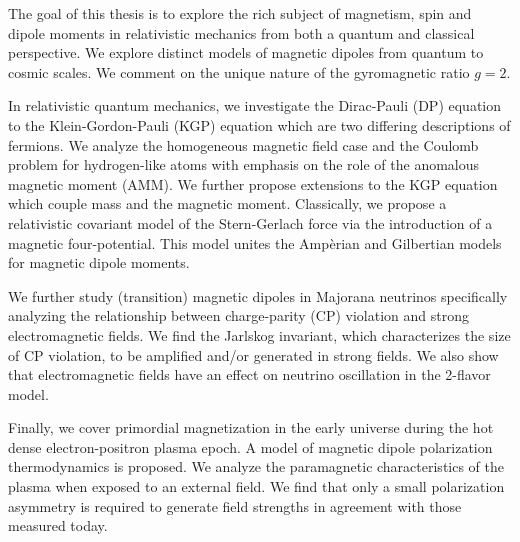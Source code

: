 

The goal of this thesis is to explore the rich subject of magnetism, spin and dipole moments in relativistic mechanics from both a quantum and classical perspective. We explore distinct models of magnetic dipoles from quantum to cosmic scales. We comment on the unique nature of the gyromagnetic ratio $g=2$.

In relativistic quantum mechanics, we investigate the Dirac-Pauli (DP) equation to the Klein-Gordon-Pauli (KGP) equation which are two differing descriptions of fermions. We analyze the homogeneous magnetic field case and the Coulomb problem for hydrogen-like atoms with emphasis on the role of the anomalous magnetic moment (AMM). We further propose extensions to the KGP equation which couple mass and the magnetic moment. Classically, we propose a relativistic covariant model of the Stern-Gerlach force via the introduction of a magnetic four-potential. This model unites the Amp{\`e}rian and Gilbertian models for magnetic dipole moments.

We further study (transition) magnetic dipoles in Majorana neutrinos specifically analyzing the relationship between charge-parity (CP) violation and strong electromagnetic fields. We find the Jarlskog invariant, which characterizes the size of CP violation, to be amplified and/or generated in strong fields. We also show that electromagnetic fields have an effect on neutrino oscillation in the 2-flavor model.

Finally, we cover primordial magnetization in the early universe during the hot dense electron-positron plasma epoch. A model of magnetic dipole polarization thermodynamics is proposed. We analyze the paramagnetic characteristics of the plasma when exposed to an external field. We find that only a small polarization asymmetry is required to generate field strengths in agreement with those measured today.